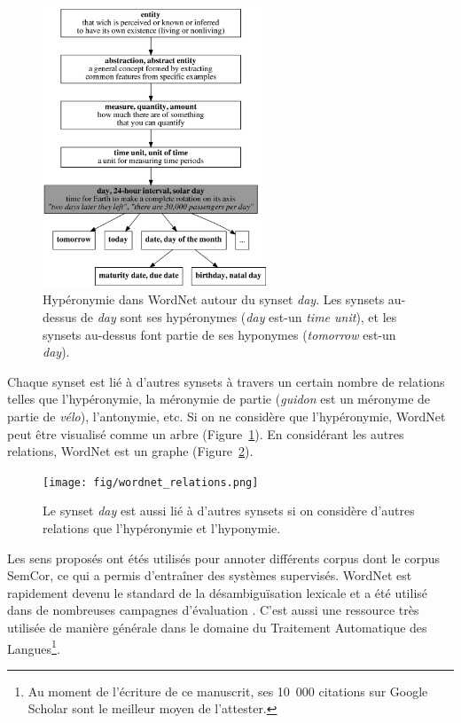 
\begin{figure}[t]
    \centering
    \includegraphics[width=0.6\textwidth]{fig/wordnet_hypernymy.png}
    \caption{\label{fig:wordnet_hypernymy}Hypéronymie dans WordNet autour du
        synset \emph{day}. Les synsets au-dessus de \emph{day} sont ses hypéronymes
        (\emph{day} est-un \emph{time unit}), et les synsets au-dessus font partie de
        ses hyponymes (\emph{tomorrow} est-un \emph{day}).}
\end{figure}

Chaque synset est lié à d'autres synsets à travers un certain nombre de
relations telles que l'hypéronymie, la méronymie de partie (\emph{guidon} est
un méronyme de partie de \emph{vélo}), l'antonymie, etc. Si on ne considère que
l'hypéronymie, WordNet peut être visualisé comme un arbre
(Figure~\ref{fig:wordnet_hypernymy}). En considérant les autres relations,
WordNet est un graphe (Figure~\ref{fig:wordnet_relations}).

\begin{figure}[t]
    \centering
    \texttt{[image: fig/wordnet\_relations.png]}
    \caption{\label{fig:wordnet_relations} Le synset \emph{day} est aussi lié à
        d'autres synsets si on considère d'autres relations que l'hypéronymie et
        l'hyponymie.}
\end{figure}

Les sens proposés ont étés utilisés pour annoter différents corpus dont le
corpus SemCor, ce qui a permis d'entraîner des systèmes supervisés. WordNet est
rapidement devenu le standard de la désambiguïsation lexicale et a été utilisé
dans de nombreuses campagnes d'évaluation \citep{navigli2009word}. C'est aussi
une ressource très utilisée de manière générale dans le domaine du Traitement
Automatique des Langues\footnote{Au moment de l'écriture de ce manuscrit, ses
10~000 citations sur Google Scholar sont le meilleur moyen de l'attester.}.

